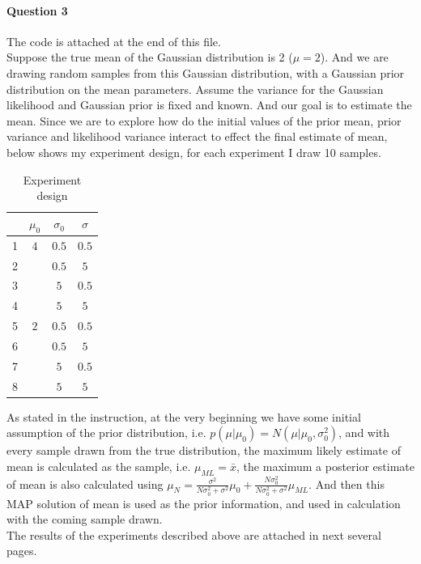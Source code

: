 \documentclass[a4paper]{article}
\begin{document}
\begin{spacing}{2.0}
\paragraph{\huge\textbf{ Question 3\\} }
\normalsize
\noindent
The code is attached at the end of this file.\\
Suppose the true mean of the Gaussian distribution is 2 ($\mu = 2$). And we are drawing random samples from this Gaussian distribution, with a Gaussian prior distribution on the mean parameters. Assume the variance for the Gaussian likelihood and Gaussian prior is fixed and known. And our goal is to estimate the mean. Since we are to explore how do the initial values of the prior mean, prior variance and likelihood variance interact to effect the final estimate of mean, below shows my experiment design, for each experiment I draw 10 samples. 
\begin{table}[htbp]
\centering
\begin{tabular}{lccc}
\hline
{ } & $\mu_0$ & $\sigma_0$ & $\sigma$ \\ \hline
{ 1} & $4$ & $0.5$ & $0.5$ \\
{ 2} & { } & $0.5$ & $5$ \\
{ 3} & { } & $5$ & $0.5$ \\ 
{ 4} & { } & $5$ & $5$ \\\hline
{ 5} & $2$ & $0.5$ & $0.5$ \\
{ 6} & { } & $0.5$ & $5$ \\
{ 7} & { } & $5$ & $0.5$ \\ 
{ 8} & { } & $5$ & $5$ \\\hline
\end{tabular}
\caption{Experiment design}
\end{table}
As stated in the instruction, at the very beginning we have some initial assumption of the prior distribution, i.e. $p(\mu|\mu_0) = N(\mu|\mu_0, \sigma_0^2)$, and with every sample drawn from the true distribution, the maximum likely estimate of mean is calculated as the sample, i.e. $\mu_{ML} = \bar x$, the maximum a posterior estimate of mean is also calculated using $\mu_N = \displaystyle\frac{\sigma^2}{N\sigma_0^2 + \sigma^2}\mu_0 + \displaystyle\frac{N\sigma_0^2}{N\sigma_0^2 + \sigma^2}\mu_{ML}$. And then this MAP solution of mean is used as the prior information, and used in calculation with the coming sample drawn. \\
The results of the experiments described above are attached in next several pages.


\end{spacing}
\end{document}
